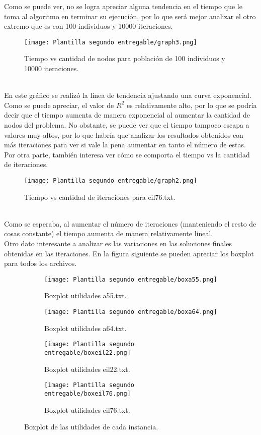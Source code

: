 \documentclass[letter, 10pt]{article}
\begin{document}
Como se puede ver, no se logra apreciar alguna tendencia en el tiempo que le toma al algoritmo en terminar su ejecución, por lo que será mejor analizar el otro extremo que es con 100 individuos y 10000 iteraciones.

\begin{figure}[H]
\centering
\texttt{[image: Plantilla segundo entregable/graph3.png]}
\caption{Tiempo vs cantidad de nodos para población de 100 individuos y 10000 iteraciones.}
\end{figure} \\

En este gráfico se realizó la línea de tendencia ajustando una curva exponencial. Como se puede apreciar, el valor de $R^2$ es relativamente alto, por lo que se podría decir que el tiempo aumenta de manera exponencial al aumentar la cantidad de nodos del problema. No obstante, se puede ver que el tiempo tampoco escapa a valores muy altos, por lo que habría que analizar los resultados obtenidos con más iteraciones para ver si vale la pena aumentar en tanto el número de estas. \\

Por otra parte, también interesa ver cómo se comporta el tiempo vs la cantidad de iteraciones.

\begin{figure}[H]
\centering
\texttt{[image: Plantilla segundo entregable/graph2.png]}
\caption{Tiempo vs cantidad de iteraciones para eil76.txt.}
\end{figure} \\

Como se esperaba, al aumentar el número de iteraciones (manteniendo el resto de cosas constante) el tiempo aumenta de manera relativamente lineal. \\

Otro dato interesante a analizar es las variaciones en las soluciones finales obtenidas en las iteraciones. En la figura siguiente se pueden apreciar los boxplot para todos los archivos.

\begin{figure}[H]
\begin{subfigure}{.5\textwidth}
  \centering
  \texttt{[image: Plantilla segundo entregable/boxa55.png]}
  \caption{Boxplot utilidades a55.txt.}
\end{subfigure}%
\begin{subfigure}{.5\textwidth}
  \centering
  \texttt{[image: Plantilla segundo entregable/boxa64.png]}
  \caption{Boxplot utilidades a64.txt.}
\end{subfigure}
\begin{subfigure}{.5\textwidth}
  \centering
  \texttt{[image: Plantilla segundo entregable/boxeil22.png]}
  \caption{Boxplot utilidades eil22.txt.}
\end{subfigure}
\begin{subfigure}{.5\textwidth}
  \centering
  \texttt{[image: Plantilla segundo entregable/boxeil76.png]}
  \caption{Boxplot utilidades eil76.txt.}
\end{subfigure}
\caption{Boxplot de las utilidades de cada instancia.}
\end{figure}
\end{document}
